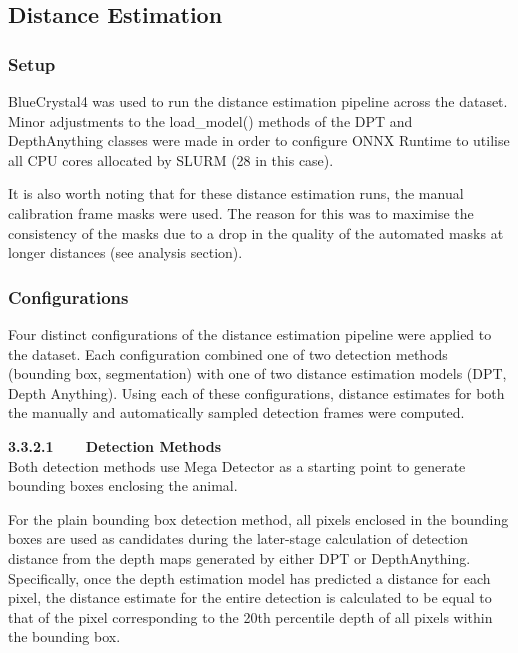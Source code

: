 \subsection{Distance Estimation}

\subsubsection{Setup}

BlueCrystal4 was used to run the distance estimation pipeline across the dataset.
Minor adjustments to the load\_model() methods of the DPT and DepthAnything classes
were made in order to configure ONNX Runtime to utilise all CPU cores allocated by
SLURM (28 in this case).

It is also worth noting that for these distance estimation runs, the manual calibration
frame masks were used.
The reason for this was to maximise the consistency of the masks due to a drop in the
quality of the automated masks at longer distances (see analysis section).

\subsubsection{Configurations}

Four distinct configurations of the distance estimation pipeline were applied to the
dataset.
Each configuration combined one of two detection methods (bounding box, segmentation) with one
of two distance estimation models (DPT, Depth Anything).
Using each of these configurations, distance estimates for both the manually and automatically
sampled detection frames were computed.

\vspace{3mm}

\textbf{3.3.2.1~~~~Detection Methods}\vspace{4.5mm}\\
Both detection methods use Mega Detector as a starting point to generate bounding boxes
enclosing the animal.

For the plain bounding box detection method, all pixels enclosed in the bounding boxes are used
as candidates during the later-stage calculation of detection distance from the depth maps
generated by either DPT or DepthAnything.
Specifically, once the depth estimation model has predicted a distance for each pixel, the
distance estimate for the entire detection is calculated to be equal to that of the pixel
corresponding to the 20th percentile depth of all pixels within the bounding box.

